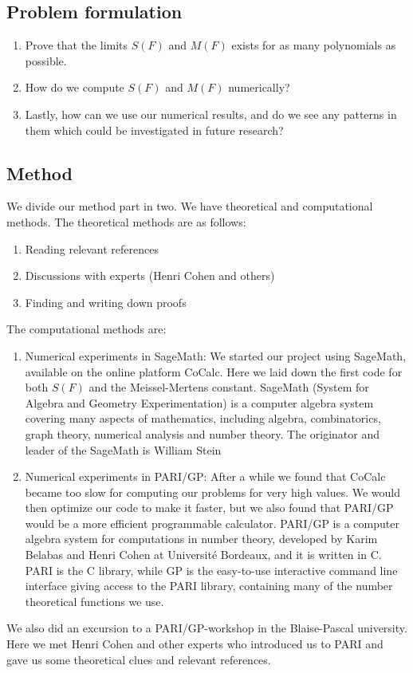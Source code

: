 \documentclass{article}
\theoremstyle{definition}
\theoremstyle{remark}
\begin{document}
\subsection{Problem formulation}
\begin{enumerate}

\item Prove that the limits $S(F)$ and $M(F)$ exists for as many polynomials as possible.

\item How do we compute $S(F)$ and $M(F)$ numerically?

\item Lastly, how can we use our numerical results, and do we see any patterns in them which could be investigated in future research?

\end{enumerate}

\subsection{Method}


We divide our method part in two. We have theoretical and computational methods.
The theoretical methods are as follows:
\begin{enumerate}
\item Reading relevant references
\item Discussions with experts (Henri Cohen and others)
\item Finding and writing down proofs
\end{enumerate}
The computational methods are:
\begin{enumerate}
\item Numerical experiments in SageMath:
We started our project using SageMath, available on the online platform CoCalc. Here we laid down the first code for both $S(F)$ and the Meissel-Mertens constant. SageMath (System for Algebra and Geometry Experimentation) is a computer algebra system covering many aspects of mathematics, including algebra, combinatorics, graph theory, numerical analysis and number theory. The originator and leader of the SageMath is William Stein
\item Numerical experiments in PARI/GP:
After a while we found that CoCalc became too slow for computing our problems for very high values. We would then optimize our code to make it faster, but we also found that PARI/GP would be a more efficient programmable calculator.
\newline
PARI/GP is a computer algebra system for computations in number theory, developed by Karim Belabas and Henri Cohen at Université Bordeaux, and it is written in C. PARI is the C library, while GP is the easy-to-use interactive command line interface giving access to the PARI library, containing many of the number theoretical functions we use.
\end{enumerate}
We also did an excursion to a PARI/GP-workshop in the Blaise-Pascal university. Here we met Henri Cohen and other experts who introduced us to PARI and gave us some theoretical clues and relevant references.
\end{document}
